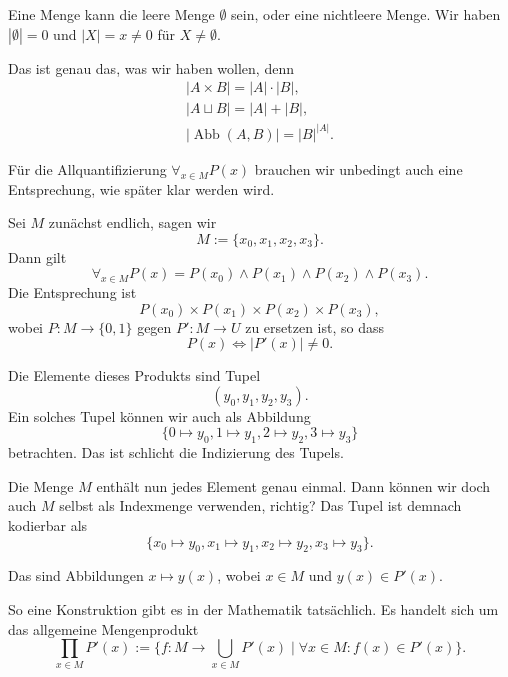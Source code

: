 \documentclass[9pt]{beamer}
\newcommand{\Abb}{\operatorname{Abb}}
\begin{document}
\begin{frame}
Eine Menge kann die leere Menge $\emptyset$ sein, oder eine
nichtleere Menge. Wir haben $|\emptyset|=0$ und
$|X|=x\ne 0$ für $X\ne\emptyset$.\pause

\vspace{1em}
Das ist genau das, was wir haben wollen, denn
\begin{gather*}
|A\times B| = |A|\cdot |B|,\\
|A\sqcup B| = |A| + |B|,\\
|\Abb(A,B)| = |B|^{|A|}.
\end{gather*}
\end{frame}

\begin{frame}
Für die Allquantifizierung $\forall_{x\in M}P(x)$ brauchen wir
unbedingt auch eine Entsprechung, wie später klar werden wird.\pause

\vspace{1em}
Sei $M$ zunächst endlich, sagen wir
\[M:=\{x_0,x_1,x_2,x_3\}.\]
Dann gilt
\[\forall_{x\in M}P(x) = P(x_0)\land P(x_1)\land P(x_2)\land P(x_3).
\]\pause
Die Entsprechung ist
\[P(x_0)\times P(x_1)\times P(x_2)\times P(x_3),\]
wobei $P\colon M\to\{0,1\}$ gegen $P'\colon M\to U$
zu ersetzen ist, so dass
\[P(x)\iff |P'(x)|\ne 0.\]
\end{frame}

\begin{frame}
Die Elemente dieses Produkts sind Tupel
\[(y_0, y_1, y_2, y_3).\]\pause
Ein solches Tupel können wir auch als Abbildung
\[\{0\mapsto y_0, 1\mapsto y_1, 2\mapsto y_2, 3\mapsto y_3\}\]
betrachten. Das ist schlicht die Indizierung des Tupels.\pause

\vspace{1em}
Die Menge $M$ enthält nun jedes Element genau einmal.
Dann können wir doch auch $M$ selbst als Indexmenge verwenden,
richtig? Das Tupel ist demnach kodierbar als
\[\{x_0\mapsto y_0, x_1\mapsto y_1, x_2\mapsto y_2, x_3\mapsto y_3\}.\]
\end{frame}

\begin{frame}
Das sind Abbildungen $x\mapsto y(x)$, wobei $x\in M$
und $y(x)\in P'(x)$.\pause

\vspace{1em}
So eine Konstruktion gibt es in der Mathematik tatsächlich.
Es handelt sich um das allgemeine Mengenprodukt
\[\prod_{x\in M} P'(x) := \{f\colon M\to \bigcup_{x\in M}P'(x)\mid \forall x\in M\colon f(x)\in P'(x)\}.\]
\end{frame}
\end{document}
